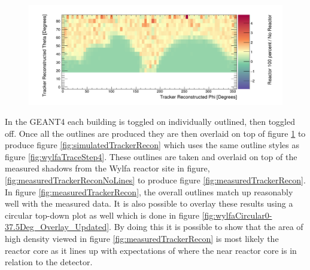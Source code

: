 \begin{figure}[!h]
 \centering
 \includegraphics[width=\linewidth]{Chapter5/Figs/wylfaRasterNew/simulatedTrackerReconNoLines.png}
 \label{fig:simulatedTrackerReconNoLines}
\end{figure}

In the GEANT4 each building is toggled on individually outlined, then toggled off. Once all the outlines are produced they are then overlaid on top of figure \ref{fig:simulatedTrackerReconNoLines} to produce figure \ref{fig:simulatedTrackerRecon} which uses the same outline styles as figure \ref{fig:wylfaTraceStep4}. These outlines are taken and overlaid on top of the measured shadows from the Wylfa reactor site in figure, \ref{fig:measuredTrackerReconNoLines} to produce figure \ref{fig:measuredTrackerRecon}. In figure \ref{fig:measuredTrackerRecon}, the overall outlines match up reasonably well with the measured data. It is also possible to overlay these results using a circular top-down plot as well which is done in figure \ref{fig:wylfaCircular0-37.5Deg_Overlay_Updated}. By doing this it is possible to show that the area of high density viewed in figure \ref{fig:measuredTrackerRecon} is most likely the reactor core as it lines up with expectations of where the near reactor core is in relation to the detector. 

